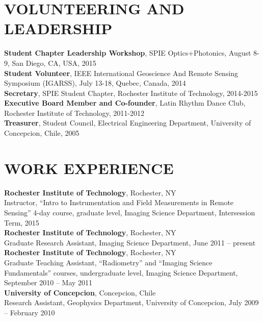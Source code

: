 \documentclass[11pt]{res} %
\begin{document}
\begin{resume}
\vspace{-0.1in}
\section{VOLUNTEERING AND LEADERSHIP}
\vspace{0.1in}
{\bf Student Chapter Leadership Workshop}, SPIE Optics+Photonics, August 8-9, San Diego, CA, USA, 2015
\vspace{0.1in}\\
{\bf Student Volunteer}, IEEE International Geoscience And Remote Sensing Symposium (IGARSS), July 13-18, Quebec, Canada, 2014
\vspace{0.1in}\\
{\bf Secretary}, SPIE Student Chapter, Rochester Institute of Technology, 2014-2015
\vspace{0.1in}\\
{\bf Executive Board Member and Co-founder}, Latin Rhythm Dance Club, Rochester Institute of Technology, 2011-2012
\vspace{0.1in}\\
{\bf Treasurer}, Student Council, Electrical Engineering Department, University of Concepcion, Chile, 2005\\

\vspace{-0.1in}
\section{WORK EXPERIENCE}
\vspace{0.1in}
{\bf Rochester Institute of Technology}, Rochester, NY\\
Instructor, ``Intro to Instrumentation and Field Measurements in Remote Sensing'' 4-day course, graduate level, Imaging Science Department, Intersession Term, 2015
\vspace{0.1in}\\
{\bf Rochester Institute of Technology}, Rochester, NY\\
Graduate Research Assistant, Imaging Science Department, June 2011 -- present
\vspace{0.1in}\\
{\bf Rochester Institute of Technology}, Rochester, NY\\
Graduate Teaching Assistant, ``Radiometry'' and  ``Imaging Science Fundamentals'' courses, undergraduate level, Imaging Science Department, September 2010 -- May 2011
\vspace{0.1in}\\
{\bf University of Concepcion}, Concepcion, Chile\\
Research Assistant, Geophysics Department, University of Concepcion, July 2009 -- February 2010



\end{resume}
\end{document}
